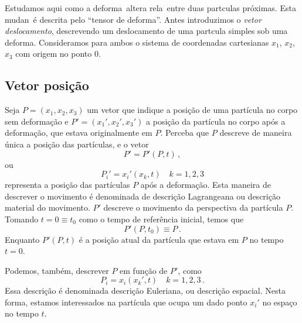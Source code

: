 Estudamos aqui como a deforma\cao\ altera rela\coes\ entre
duas part\ih culas pr\'oximas. Esta mudan\ca\
\'e descrita pelo ``tensor de deforma\cao''. Antes
introduzimos o {\it vetor deslocamento}, descrevendo um
deslocamento de uma part\ih cula simples sob uma
deforma\cao. Consideramos para ambos o sistema de
coordenadas cartesianas $x_1$, $x_2$, $x_3$ com origem no ponto 0.

\subsection{Vetor posi\c{c}\~ao}
Seja $P = (x_1,x_2,x_3)$ um vetor que indique a posi\c{c}\~ao de uma part\'icula
no corpo sem deforma\c{c}\~ao e $P'=(x_1',x_2',x_3')$ a posi\c{c}\~ao da
part\'icula no corpo ap\'os a deforma\c{c}\~ao, que estava originalmente em $P$. Perceba que $P$
descreve de maneira \'unica a posi\c{c}\~ao das part\'iculas, e o vetor
\begin{equation}
  P' = P'(P,t)\, ,
\end{equation}
ou
\begin{equation}
  P_i' = x_i'(x_k,t) \quad k=1,2,3 \label{eq:lagrangeana}
\end{equation}
representa a posi\c{c}\~ao das part\'iculas $P$ ap\'os a deforma\c{c}\~ao. 
Esta maneira de descrever o movimento
\'e denominada de descri\c{c}\~ao Lagrangeana ou descri\c{c}\~ao material do
movimento. $P'$ descreve o movimento da perspectiva da part\'icula $P$.
Tomando $t = 0 \equiv t_0$ como o tempo de refer\^encia inicial, temos
que
\begin{equation}
  P'(P,t_0) \equiv P \, .
\end{equation}
Enquanto $P'(P,t)$ \'e a posi\c{c}\~ao atual da part\'icula que estava em $P$ no tempo
$t=0$.

Podemos, tamb\'em, descrever $P$ em fun\c{c}\~ao de $P'$, como
\begin{equation}
  P_i = x_i(x_k',t) \quad k=1,2,3\, . \label{eq:euleriana}
\end{equation}
Essa descri\c{c}\~ao \'e denominada descri\c{c}\~ao Euleriana, ou
descri\c{c}\~ao espacial. Nesta forma, estamos interessados na part\'icula que
ocupa um dado ponto $x_ i'$ no espa\c{c}o no tempo $t$.

